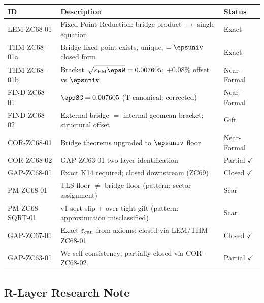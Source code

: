 \documentclass[12pt, a4paper]{article}
\renewcommand{\epsEM}{\varepsilon_{\rm EM}}
\renewcommand{\epscan}{\varepsilon_{\rm can}}
\begin{document}
\begin{formalbox}[title={Atomic Registry --- ZC68 v2}]
\begin{center}
\renewcommand{\arraystretch}{1.3}
\small
\begin{tabular}{lp{8.0cm}l}
\toprule
\textbf{ID} & \textbf{Description} & \textbf{Status} \\
\midrule
LEM-ZC68-01
  & Fixed-Point Reduction: bridge product $\to$ single equation
  & Exact \\[3pt]
THM-ZC68-01a
  & Bridge fixed point exists, unique, $=\epsuniv$ closed form
  & Exact \\[3pt]
THM-ZC68-01b
  & Bracket $\sqrt{\epsEM\epsW}=0.007605$; $+0.08\%$ offset vs $\epsuniv$
  & Near-Formal \\[3pt]
FIND-ZC68-01
  & $\epsSC=0.007605$ (T-canonical; corrected)
  & Near-Formal \\[3pt]
FIND-ZC68-02
  & External bridge $=$ internal geomean bracket; structural offset
  & Gift \\[3pt]
COR-ZC68-01
  & Bridge theorems upgraded to $\epsuniv$ floor
  & Near-Formal \\[3pt]
COR-ZC68-02
  & GAP-ZC63-01 two-layer identification
  & Partial $\checkmark$ \\[3pt]
GAP-ZC68-01
  & Exact K14 required; closed downstream (ZC69)
  & Closed $\checkmark$ \\[3pt]
PM-ZC68-01
  & TLS floor $\neq$ bridge floor (pattern: sector assignment)
  & Scar \\[3pt]
PM-ZC68-SQRT-01
  & v1 sqrt slip + over-tight gift (pattern: approximation misclassified)
  & Scar \\[3pt]
\midrule
GAP-ZC67-01 & Exact $\epscan$ from axioms; closed via LEM/THM-ZC68-01
  & Closed $\checkmark$ \\
GAP-ZC63-01 & Wc self-consistency; partially closed via COR-ZC68-02
  & Partial $\checkmark$ \\
\bottomrule
\end{tabular}
\end{center}
\end{formalbox}

\subsection{R-Layer Research Note}
\label{sec:rlayer}
\end{document}
